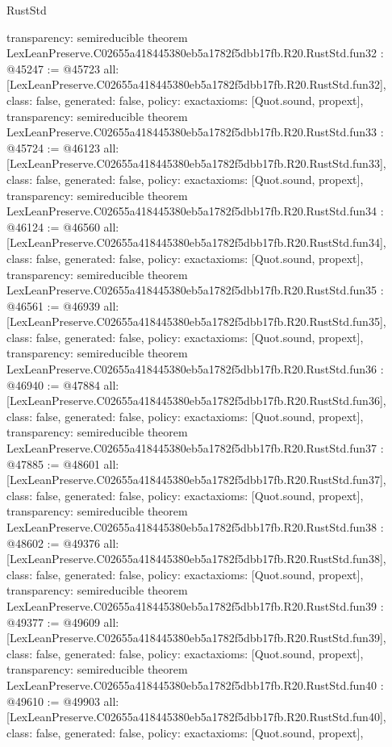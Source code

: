 \begin{lexlean}{RustStd}
\begin{coremodule}
{  transparency: semireducible
}
theorem LexLeanPreserve.C02655a418445380eb5a1782f5dbb17fb.R20.RustStd.fun32 : @45247 := @45723 {
  all: [LexLeanPreserve.C02655a418445380eb5a1782f5dbb17fb.R20.RustStd.fun32],
  class: false,
  generated: false,
  policy: exact{axioms: [Quot.sound, propext]},
  transparency: semireducible
}
theorem LexLeanPreserve.C02655a418445380eb5a1782f5dbb17fb.R20.RustStd.fun33 : @45724 := @46123 {
  all: [LexLeanPreserve.C02655a418445380eb5a1782f5dbb17fb.R20.RustStd.fun33],
  class: false,
  generated: false,
  policy: exact{axioms: [Quot.sound, propext]},
  transparency: semireducible
}
theorem LexLeanPreserve.C02655a418445380eb5a1782f5dbb17fb.R20.RustStd.fun34 : @46124 := @46560 {
  all: [LexLeanPreserve.C02655a418445380eb5a1782f5dbb17fb.R20.RustStd.fun34],
  class: false,
  generated: false,
  policy: exact{axioms: [Quot.sound, propext]},
  transparency: semireducible
}
theorem LexLeanPreserve.C02655a418445380eb5a1782f5dbb17fb.R20.RustStd.fun35 : @46561 := @46939 {
  all: [LexLeanPreserve.C02655a418445380eb5a1782f5dbb17fb.R20.RustStd.fun35],
  class: false,
  generated: false,
  policy: exact{axioms: [Quot.sound, propext]},
  transparency: semireducible
}
theorem LexLeanPreserve.C02655a418445380eb5a1782f5dbb17fb.R20.RustStd.fun36 : @46940 := @47884 {
  all: [LexLeanPreserve.C02655a418445380eb5a1782f5dbb17fb.R20.RustStd.fun36],
  class: false,
  generated: false,
  policy: exact{axioms: [Quot.sound, propext]},
  transparency: semireducible
}
theorem LexLeanPreserve.C02655a418445380eb5a1782f5dbb17fb.R20.RustStd.fun37 : @47885 := @48601 {
  all: [LexLeanPreserve.C02655a418445380eb5a1782f5dbb17fb.R20.RustStd.fun37],
  class: false,
  generated: false,
  policy: exact{axioms: [Quot.sound, propext]},
  transparency: semireducible
}
theorem LexLeanPreserve.C02655a418445380eb5a1782f5dbb17fb.R20.RustStd.fun38 : @48602 := @49376 {
  all: [LexLeanPreserve.C02655a418445380eb5a1782f5dbb17fb.R20.RustStd.fun38],
  class: false,
  generated: false,
  policy: exact{axioms: [Quot.sound, propext]},
  transparency: semireducible
}
theorem LexLeanPreserve.C02655a418445380eb5a1782f5dbb17fb.R20.RustStd.fun39 : @49377 := @49609 {
  all: [LexLeanPreserve.C02655a418445380eb5a1782f5dbb17fb.R20.RustStd.fun39],
  class: false,
  generated: false,
  policy: exact{axioms: [Quot.sound, propext]},
  transparency: semireducible
}
theorem LexLeanPreserve.C02655a418445380eb5a1782f5dbb17fb.R20.RustStd.fun40 : @49610 := @49903 {
  all: [LexLeanPreserve.C02655a418445380eb5a1782f5dbb17fb.R20.RustStd.fun40],
  class: false,
  generated: false,
  policy: exact{axioms: [Quot.sound, propext]},
}
\end{coremodule}
\end{lexlean}
